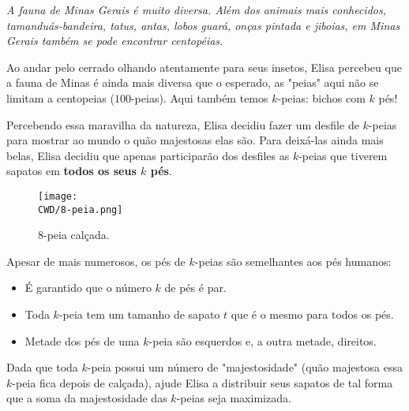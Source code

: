 %

\textit{
  A fauna de Minas Gerais é muito diversa. Além dos animais mais conhecidos, tamanduás-bandeira, tatus, antas, lobos guará, onças pintada e jiboias, em Minas Gerais também se pode encontrar centopéias. 
  }
  
  Ao andar pelo cerrado olhando atentamente para seus insetos, Elisa percebeu que a fauna de Minas é ainda mais diversa que o esperado, as "peias" aqui não se limitam a centopeias ($100$-peias). Aqui também temos $k$-peias: bichos com $k$ pés!
    
  Percebendo essa maravilha da natureza, Elisa decidiu fazer um desfile de $k$-peias para mostrar ao mundo o quão majestosas elas são. Para deixá-las ainda mais belas, Elisa decidiu que apenas participarão dos desfiles as $k$-peias que tiverem sapatos em \textbf{todos os seus $k$ pés}. 
  
  \begin{figure}[H]
    \centering
    \texttt{[image: \\CWD/8-peia.png]}
    \caption{8-peia calçada.}
  \end{figure}

  Apesar de mais numerosos, os pés de $k$-peias são semelhantes aos pés humanos:
\begin{itemize}
  \item É garantido que o número $k$ de pés é par.
  \item Toda $k$-peia tem um tamanho de sapato $t$ que é o mesmo para todos os pés.
  \item Metade dos pés de uma $k$-peia são esquerdos e, a outra metade, direitos.
\end{itemize}

Dada que toda $k$-peia possui um número de "majestosidade" (quão majestosa essa $k$-peia fica depois de calçada), ajude Elisa a distribuir seus sapatos de tal forma que a soma da majestosidade das $k$-peias seja maximizada.

%

